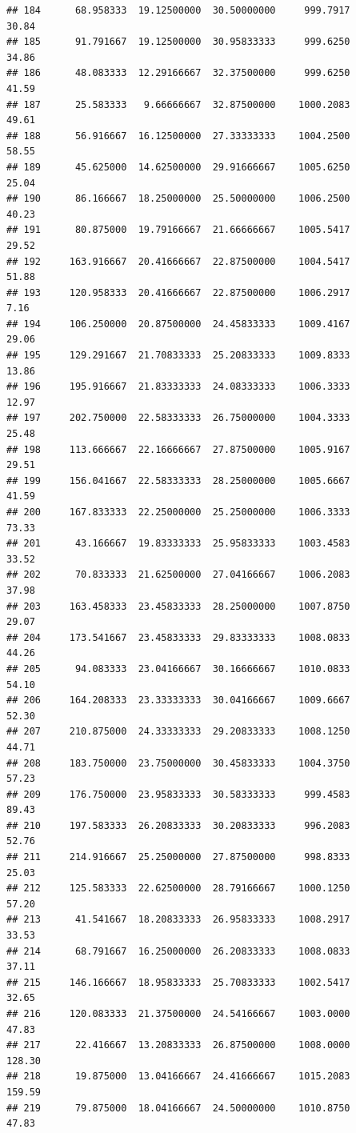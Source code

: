 \documentclass[
]{article}
\begin{document}
\begin{verbatim}
## 184      68.958333  19.12500000  30.50000000     999.7917       30.84
## 185      91.791667  19.12500000  30.95833333     999.6250       34.86
## 186      48.083333  12.29166667  32.37500000     999.6250       41.59
## 187      25.583333   9.66666667  32.87500000    1000.2083       49.61
## 188      56.916667  16.12500000  27.33333333    1004.2500       58.55
## 189      45.625000  14.62500000  29.91666667    1005.6250       25.04
## 190      86.166667  18.25000000  25.50000000    1006.2500       40.23
## 191      80.875000  19.79166667  21.66666667    1005.5417       29.52
## 192     163.916667  20.41666667  22.87500000    1004.5417       51.88
## 193     120.958333  20.41666667  22.87500000    1006.2917        7.16
## 194     106.250000  20.87500000  24.45833333    1009.4167       29.06
## 195     129.291667  21.70833333  25.20833333    1009.8333       13.86
## 196     195.916667  21.83333333  24.08333333    1006.3333       12.97
## 197     202.750000  22.58333333  26.75000000    1004.3333       25.48
## 198     113.666667  22.16666667  27.87500000    1005.9167       29.51
## 199     156.041667  22.58333333  28.25000000    1005.6667       41.59
## 200     167.833333  22.25000000  25.25000000    1006.3333       73.33
## 201      43.166667  19.83333333  25.95833333    1003.4583       33.52
## 202      70.833333  21.62500000  27.04166667    1006.2083       37.98
## 203     163.458333  23.45833333  28.25000000    1007.8750       29.07
## 204     173.541667  23.45833333  29.83333333    1008.0833       44.26
## 205      94.083333  23.04166667  30.16666667    1010.0833       54.10
## 206     164.208333  23.33333333  30.04166667    1009.6667       52.30
## 207     210.875000  24.33333333  29.20833333    1008.1250       44.71
## 208     183.750000  23.75000000  30.45833333    1004.3750       57.23
## 209     176.750000  23.95833333  30.58333333     999.4583       89.43
## 210     197.583333  26.20833333  30.20833333     996.2083       52.76
## 211     214.916667  25.25000000  27.87500000     998.8333       25.03
## 212     125.583333  22.62500000  28.79166667    1000.1250       57.20
## 213      41.541667  18.20833333  26.95833333    1008.2917       33.53
## 214      68.791667  16.25000000  26.20833333    1008.0833       37.11
## 215     146.166667  18.95833333  25.70833333    1002.5417       32.65
## 216     120.083333  21.37500000  24.54166667    1003.0000       47.83
## 217      22.416667  13.20833333  26.87500000    1008.0000      128.30
## 218      19.875000  13.04166667  24.41666667    1015.2083      159.59
## 219      79.875000  18.04166667  24.50000000    1010.8750       47.83

\end{verbatim}
\end{document}
